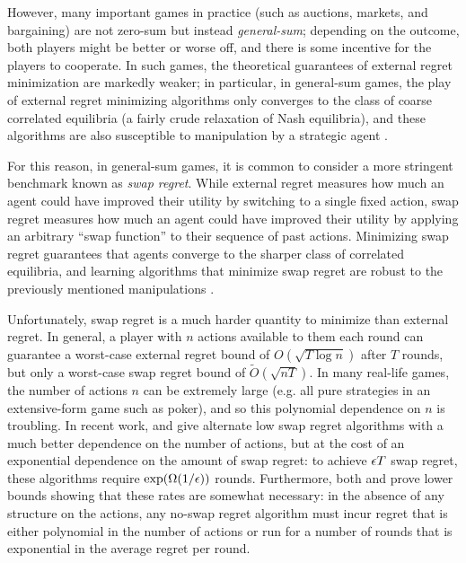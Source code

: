 \documentclass[final,12pt]{alt2025}
\begin{document}
However, many important games in practice (such as auctions, markets, and bargaining) are not zero-sum but instead \emph{general-sum}; depending on the outcome, both players might be better or worse off, and there is some incentive for the players to cooperate. In such games, the theoretical guarantees of external regret minimization are markedly weaker; in particular, in general-sum games, the play of external regret minimizing algorithms only converges to the class of coarse correlated equilibria (a fairly crude relaxation of Nash equilibria), and these algorithms are also susceptible to manipulation by a strategic agent \citep{braverman2018selling, deng2019strategizing}. 

For this reason, in general-sum games, it is common to consider a more stringent benchmark known as \emph{swap regret}. While external regret measures how much an agent could have improved their utility by switching to a single fixed action, swap regret measures how much an agent could have improved their utility by applying an arbitrary ``swap function'' to their sequence of past actions. Minimizing swap regret guarantees that agents converge to the sharper class of correlated equilibria, and learning algorithms that minimize swap regret are robust to the previously mentioned manipulations \citep{blum2007external, deng2019strategizing}. 

Unfortunately, swap regret is a much harder quantity to minimize than external regret. In general, a player with $n$ actions available to them each round can guarantee a worst-case external regret bound of $O(\sqrt{T\log n})$ after $T$ rounds, but only a worst-case swap regret bound of $\tilde{O}(\sqrt{nT})$. In many real-life games, the number of actions $n$ can be extremely large (e.g. all pure strategies in an extensive-form game such as poker), and so this polynomial dependence on $n$ is troubling. In recent work, \cite{dagan2023external} and \cite{peng2023fast} give alternate low swap regret algorithms with a much better dependence on the number of actions, but at the cost of an exponential dependence on the amount of swap regret: to achieve $\epsilon T$ swap regret, these algorithms require $\exp(\Omega(1/\epsilon))$ rounds. Furthermore, both \cite{dagan2023external} and \cite{peng2023fast} prove lower bounds showing that these rates are somewhat necessary: in the absence of any structure on the actions, any no-swap regret algorithm must incur regret that is either polynomial in the number of actions or run for a number of rounds that is exponential in the average regret per round.
\end{document}
